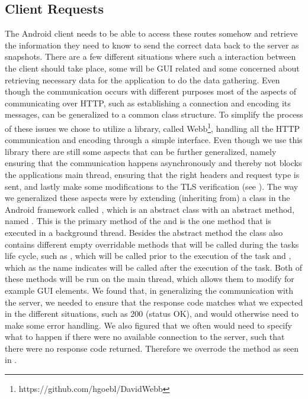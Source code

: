 \subsection{Client Requests}
\label{sub:client_requests}

The Android client needs to be able to access these routes somehow and retrieve the information they need to know to send the correct data back to the server as snapshots. There are a few different situations where such a interaction between the client should take place, some will be GUI related and some concerned about retrieving necessary data for the application to do the data gathering. Even though the communication occurs with different purposes most of the aspects of communicating over HTTP, such as establishing a connection and encoding its messages, can be generalized to a common class structure. To simplify the process of these issues we chose to utilize a library, called Webb\footnote{https://github.com/hgoebl/DavidWebb}, handling all the HTTP communication and encoding through a simple interface. Even though we use this library there are still some aspects that can be further generalized, namely ensuring that the communication happens asynchronously and thereby not blocks the applications main thread, ensuring that the right headers and request type is sent, and lastly make some modifications to the TLS verification (see ). The way we generalized these aspects were by extending (inheriting from) a class in the Android framework called , which is an abstract class with an abstract method, named . This is the primary method of the  and is the one method that is executed in a background thread. Besides the abstract method the class also contains different empty overridable methods that will be called during the tasks life cycle, such as , which will be called prior to the execution of the task and , which as the name indicates will be called after the execution of the task. Both of these methods will be run on the main thread, which allows them to modify for example GUI elements. We found that, in generalizing the communication with the server, we needed to ensure that the response code matches what we expected in the different situations, such as 200 (status OK), and would otherwise need to make some error handling. We also figured that we often would need to specify what to happen if there were no available connection to the server, such that there were no response code returned. Therefore we overrode the  method as seen in . 

